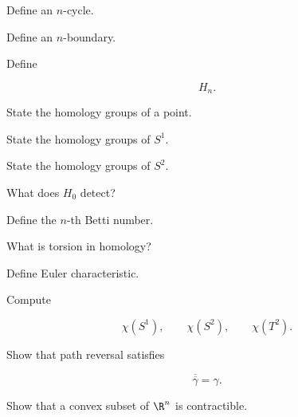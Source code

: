 \begin{exercise}[1]
Define an \(n\)-cycle.
\end{exercise}

\begin{exercise}[1]
Define an \(n\)-boundary.
\end{exercise}

\begin{exercise}[1]
Define

\[
H_n.
\]
\end{exercise}

\begin{exercise}[1]
State the homology groups of a point.
\end{exercise}

\begin{exercise}[1]
State the homology groups of \(S^1\).
\end{exercise}

\begin{exercise}[1]
State the homology groups of \(S^2\).
\end{exercise}

\begin{exercise}[1]
What does \(H_0\) detect?
\end{exercise}

\begin{exercise}[1]
Define the \(n\)-th Betti number.
\end{exercise}

\begin{exercise}[1]
What is torsion in homology?
\end{exercise}

\begin{exercise}[1]
Define Euler characteristic.
\end{exercise}

\begin{exercise}[1]
Compute

\[
\chi(S^1),
\qquad
\chi(S^2),
\qquad
\chi(T^2).
\]
\end{exercise}

\begin{exercise}[2]
Show that path reversal satisfies

\[
\overline{\overline{\gamma}}=\gamma.
\]
\end{exercise}

\begin{exercise}[2]
Show that a convex subset of \(\R^n\) is contractible.
\end{exercise}

